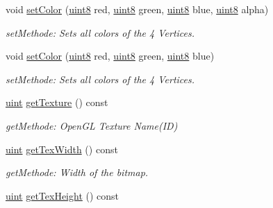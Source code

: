 \begin{DoxyCompactItemize}
void \hyperlink{class_f2_c_1_1_sprite_base_a70ecaf3b26c6a7e1490d276895a82694}{setColor} (\hyperlink{namespace_f2_c_a711deb33697d145669b9c0c4fe87c7ca}{uint8} red, \hyperlink{namespace_f2_c_a711deb33697d145669b9c0c4fe87c7ca}{uint8} green, \hyperlink{namespace_f2_c_a711deb33697d145669b9c0c4fe87c7ca}{uint8} blue, \hyperlink{namespace_f2_c_a711deb33697d145669b9c0c4fe87c7ca}{uint8} alpha)
\begin{DoxyCompactList}\small\item\em setMethode: Sets all colors of the 4 Vertices. \item\end{DoxyCompactList}\item 
void \hyperlink{class_f2_c_1_1_sprite_base_ad28077e5723498e1257b461abd805395}{setColor} (\hyperlink{namespace_f2_c_a711deb33697d145669b9c0c4fe87c7ca}{uint8} red, \hyperlink{namespace_f2_c_a711deb33697d145669b9c0c4fe87c7ca}{uint8} green, \hyperlink{namespace_f2_c_a711deb33697d145669b9c0c4fe87c7ca}{uint8} blue)
\begin{DoxyCompactList}\small\item\em setMethode: Sets all colors of the 4 Vertices. \item\end{DoxyCompactList}\item 
\hypertarget{class_f2_c_1_1_sprite_base_ab7b28dcc3e7c3fc26a6ffe1ae9c35ff0}{
\hyperlink{namespace_f2_c_a58be2bac9eb3e3c99cb41b6008bf4fae}{uint} \hyperlink{class_f2_c_1_1_sprite_base_ab7b28dcc3e7c3fc26a6ffe1ae9c35ff0}{getTexture} () const }
\label{class_f2_c_1_1_sprite_base_ab7b28dcc3e7c3fc26a6ffe1ae9c35ff0}

\begin{DoxyCompactList}\small\item\em getMethode: OpenGL Texture Name(ID) \item\end{DoxyCompactList}\item 
\hypertarget{class_f2_c_1_1_sprite_base_a38e5444bfd4600d0d32b5bfe7c5661d4}{
\hyperlink{namespace_f2_c_a58be2bac9eb3e3c99cb41b6008bf4fae}{uint} \hyperlink{class_f2_c_1_1_sprite_base_a38e5444bfd4600d0d32b5bfe7c5661d4}{getTexWidth} () const }
\label{class_f2_c_1_1_sprite_base_a38e5444bfd4600d0d32b5bfe7c5661d4}

\begin{DoxyCompactList}\small\item\em getMethode: Width of the bitmap. \item\end{DoxyCompactList}\item 
\hypertarget{class_f2_c_1_1_sprite_base_a12c777b014bd94631e0d232e97b069c6}{
\hyperlink{namespace_f2_c_a58be2bac9eb3e3c99cb41b6008bf4fae}{uint} \hyperlink{class_f2_c_1_1_sprite_base_a12c777b014bd94631e0d232e97b069c6}{getTexHeight} () const }
\label{class_f2_c_1_1_sprite_base_a12c777b014bd94631e0d232e97b069c6}


\end{DoxyCompactItemize}
